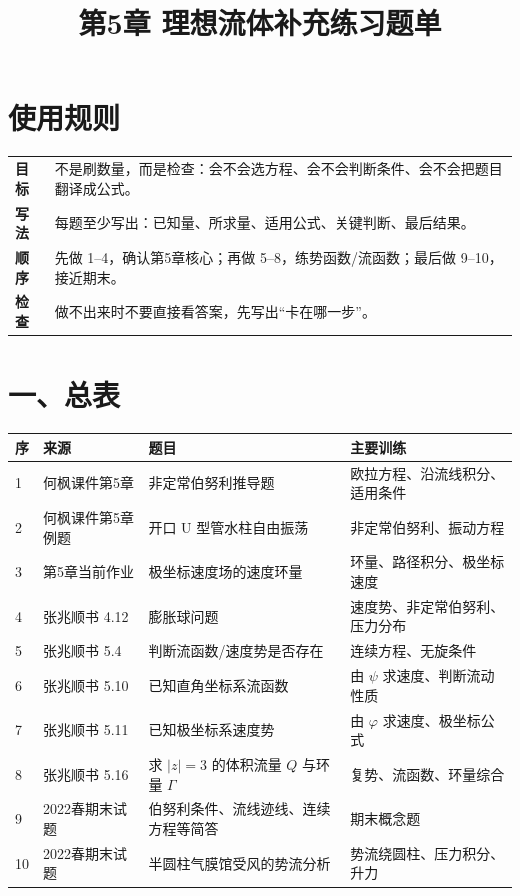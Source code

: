 \documentclass[UTF8,zihao=-4]{ctexart}
\title{\bfseries 第5章 理想流体补充练习题单}
\author{}
\date{}
\newcommand{\src}[1]{\textcolor{blue!55!black}{#1}}
\begin{document}
\maketitle

\section*{使用规则}

\begin{tabular}{>{\bfseries}p{3cm}p{11.2cm}}
\toprule
目标 & 不是刷数量，而是检查：会不会选方程、会不会判断条件、会不会把题目翻译成公式。\\
写法 & 每题至少写出：已知量、所求量、适用公式、关键判断、最后结果。\\
顺序 & 先做 1--4，确认第5章核心；再做 5--8，练势函数/流函数；最后做 9--10，接近期末。\\
检查 & 做不出来时不要直接看答案，先写出“卡在哪一步”。\\
\bottomrule
\end{tabular}

\section*{一、总表}

\begin{longtable}{p{0.7cm}p{3.1cm}p{5.6cm}p{4.6cm}}
\toprule
\textbf{序} & \textbf{来源} & \textbf{题目} & \textbf{主要训练}\\
\midrule
1 & \src{何枫课件第5章} & 非定常伯努利推导题 & 欧拉方程、沿流线积分、适用条件\\
2 & \src{何枫课件第5章例题} & 开口 U 型管水柱自由振荡 & 非定常伯努利、振动方程\\
3 & \src{第5章当前作业} & 极坐标速度场的速度环量 & 环量、路径积分、极坐标速度\\
4 & \src{张兆顺书 4.12} & 膨胀球问题 & 速度势、非定常伯努利、压力分布\\
5 & \src{张兆顺书 5.4} & 判断流函数/速度势是否存在 & 连续方程、无旋条件\\
6 & \src{张兆顺书 5.10} & 已知直角坐标系流函数 & 由 $\psi$ 求速度、判断流动性质\\
7 & \src{张兆顺书 5.11} & 已知极坐标系速度势 & 由 $\varphi$ 求速度、极坐标公式\\
8 & \src{张兆顺书 5.16} & 求 $|z|=3$ 的体积流量 $Q$ 与环量 $\Gamma$ & 复势、流函数、环量综合\\
9 & \src{2022春期末试题} & 伯努利条件、流线迹线、连续方程等简答 & 期末概念题\\
10 & \src{2022春期末试题} & 半圆柱气膜馆受风的势流分析 & 势流绕圆柱、压力积分、升力\\
\bottomrule
\end{longtable}
\end{document}
